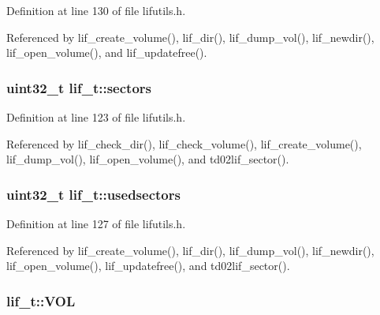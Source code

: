Definition at line 130 of file lifutils.\+h.



Referenced by lif\+\_\+create\+\_\+volume(), lif\+\_\+dir(), lif\+\_\+dump\+\_\+vol(), lif\+\_\+newdir(), lif\+\_\+open\+\_\+volume(), and lif\+\_\+updatefree().

\subsubsection[{\texorpdfstring{sectors}{sectors}}]{\setlength{\rightskip}{0pt plus 5cm}uint32\+\_\+t lif\+\_\+t\+::sectors}\hypertarget{structlif__t_a262b14d8547abff49d9dd1b445faf6d5}{}\label{structlif__t_a262b14d8547abff49d9dd1b445faf6d5}


Definition at line 123 of file lifutils.\+h.



Referenced by lif\+\_\+check\+\_\+dir(), lif\+\_\+check\+\_\+volume(), lif\+\_\+create\+\_\+volume(), lif\+\_\+dump\+\_\+vol(), lif\+\_\+open\+\_\+volume(), and td02lif\+\_\+sector().

\subsubsection[{\texorpdfstring{usedsectors}{usedsectors}}]{\setlength{\rightskip}{0pt plus 5cm}uint32\+\_\+t lif\+\_\+t\+::usedsectors}\hypertarget{structlif__t_ad81767a2f65b997d5abecba130b89814}{}\label{structlif__t_ad81767a2f65b997d5abecba130b89814}


Definition at line 127 of file lifutils.\+h.



Referenced by lif\+\_\+create\+\_\+volume(), lif\+\_\+dir(), lif\+\_\+dump\+\_\+vol(), lif\+\_\+newdir(), lif\+\_\+open\+\_\+volume(), lif\+\_\+updatefree(), and td02lif\+\_\+sector().

\subsubsection[{\texorpdfstring{V\+OL}{VOL}}]{ lif\+\_\+t\+::\+V\+OL}\hypertarget{structlif__t_ae68126d2b9261ef9a6903a95d5c82cac}{}\label{structlif__t_ae68126d2b9261ef9a6903a95d5c82cac}


